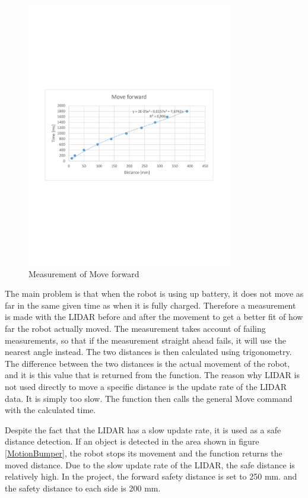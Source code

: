 \begin{figure}[H]
\centering
\includegraphics[width=0.8\textwidth]{billeder/MoveForwardGraph.pdf}
\caption{Measurement of Move forward}\label{MoveForwardGraph}
\end{figure} 

The main problem is that when the robot is using up battery, it does not move as far in the same given time as when it is fully charged. Therefore a measurement is made with the LIDAR before and after the movement to get a better fit of how far the robot actually moved. The measurement takes account of failing measurements, so that if the measurement straight ahead fails, it will use the nearest angle instead. The two distances is then calculated using trigonometry.
The difference between the two distances is the actual movement of the robot, and it is this value that is returned from the function.
The reason why LIDAR is not used directly to move a specific distance is the update rate of the LIDAR data. It is simply too slow. The function then calls the general Move command with the calculated time.

Despite the fact that the LIDAR has a slow update rate, it is used as a safe distance detection. If an object is detected in the area shown in figure \ref{MotionBumper}, the robot stops its movement and the function returns the moved distance. Due to the slow update rate of the LIDAR, the safe distance is relatively high. In the project, the forward safety distance is set to 250 mm. and the safety distance to each side is 200 mm.

